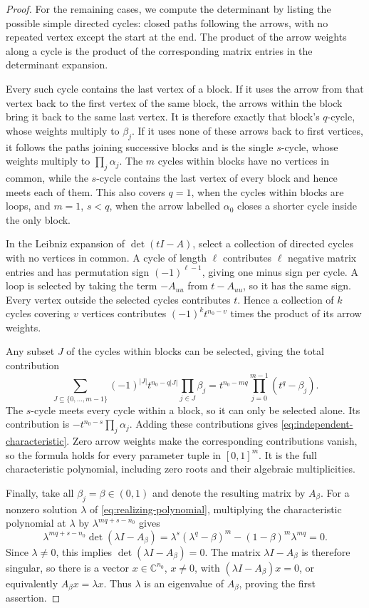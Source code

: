 \documentclass[11pt,a4paper]{article}
\theoremstyle{definition}
\theoremstyle{remark}
\numberwithin{equation}{section}
\begin{document}
\begin{proof}
For the remaining cases, we compute the determinant by listing the possible simple directed cycles: closed paths following the arrows, with no repeated vertex except the start at the end. The product of the arrow weights along a cycle is the product of the corresponding matrix entries in the determinant expansion.

Every such cycle contains the last vertex of a block. If it uses the arrow from that vertex back to the first vertex of the same block, the arrows within the block bring it back to the same last vertex. It is therefore exactly that block's $q$-cycle, whose weights multiply to $\beta_j$. If it uses none of these arrows back to first vertices, it follows the paths joining successive blocks and is the single $s$-cycle, whose weights multiply to $\prod_j\alpha_j$. The $m$ cycles within blocks have no vertices in common, while the $s$-cycle contains the last vertex of every block and hence meets each of them. This also covers $q=1$, when the cycles within blocks are loops, and $m=1$, $s<q$, when the arrow labelled $\alpha_0$ closes a shorter cycle inside the only block.

In the Leibniz expansion of $\det(tI-A)$, select a collection of directed cycles with no vertices in common. A cycle of length $\ell$ contributes $\ell$ negative matrix entries and has permutation sign $(-1)^{\ell-1}$, giving one minus sign per cycle. A loop is selected by taking the term $-A_{uu}$ from $t-A_{uu}$, so it has the same sign. Every vertex outside the selected cycles contributes $t$. Hence a collection of $k$ cycles covering $v$ vertices contributes $(-1)^k t^{n_0-v}$ times the product of its arrow weights.

Any subset $J$ of the cycles within blocks can be selected, giving the total contribution
\[
 \sum_{J\subseteq\{0,\ldots,m-1\}}
 (-1)^{|J|}t^{n_0-q|J|}\prod_{j\in J}\beta_j
 =t^{n_0-mq}\prod_{j=0}^{m-1}(t^q-\beta_j).
\]
The $s$-cycle meets every cycle within a block, so it can only be selected alone. Its contribution is $-t^{n_0-s}\prod_j\alpha_j$. Adding these contributions gives \eqref{eq:independent-characteristic}. Zero arrow weights make the corresponding contributions vanish, so the formula holds for every parameter tuple in $[0,1]^m$. It is the full characteristic polynomial, including zero roots and their algebraic multiplicities.

Finally, take all $\beta_j=\beta\in(0,1)$ and denote the resulting matrix by $A_\beta$. For a nonzero solution $\lambda$ of \eqref{eq:realizing-polynomial}, multiplying the characteristic polynomial at $\lambda$ by $\lambda^{mq+s-n_0}$ gives
\[
 \lambda^{mq+s-n_0}\det(\lambda I-A_\beta)
 =\lambda^s(\lambda^q-\beta)^m-(1-\beta)^m\lambda^{mq}=0.
\]
Since $\lambda\ne0$, this implies $\det(\lambda I-A_\beta)=0$. The matrix $\lambda I-A_\beta$ is therefore singular, so there is a vector $x\in\mathbb C^{n_0}$, $x\ne0$, with $(\lambda I-A_\beta)x=0$, or equivalently $A_\beta x=\lambda x$. Thus $\lambda$ is an eigenvalue of $A_\beta$, proving the first assertion.
\end{proof}
\end{document}
